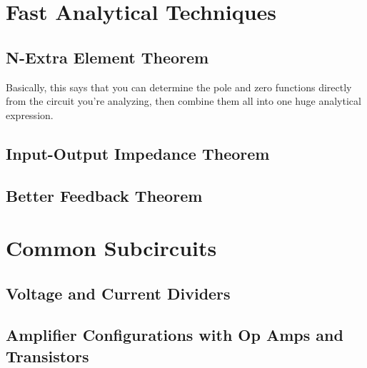 \section{Fast Analytical Techniques}
\subsection{N-Extra Element Theorem}
Basically, this says that you can determine the pole and zero functions directly from the circuit you're analyzing, then combine them all into one huge analytical expression.
\subsection{Input-Output Impedance Theorem}
\subsection{Better Feedback Theorem}
\section{Common Subcircuits}
\subsection{Voltage and Current Dividers}





\subsection{Amplifier Configurations with Op Amps and Transistors}


